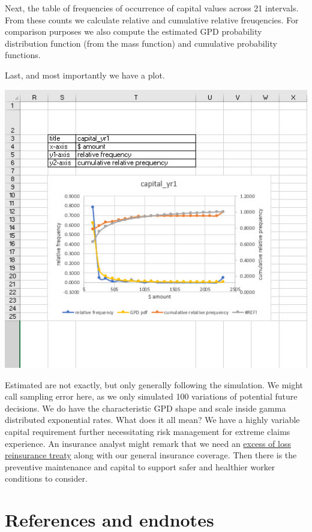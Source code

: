 \documentclass[
]{book}
\begin{document}
Next, the table of frequencies of occurrence of capital values across 21 intervals. From these counts we calculate relative and cumulative relative freuqencies. For comparison purposes we also compute the estimated GPD probability distribution function (from the mass function) and cumulative probability functions.

Last, and most importantly we have a plot.

\includegraphics{images/06/claims-eda-sim-plot.jpg}

Estimated are not exactly, but only generally following the simulation. We might call sampling error here, as we only simulated 100 variations of potential future decisions. We do have the characteristic GPD shape and scale inside gamma distributed exponential rates. What does it all mean? We have a highly variable capital requirement further necessitating risk management for extreme claims experience. An insurance analyst might remark that we need an \href{https://www.investopedia.com/terms/t/treaty-reinsurance.asp\#:~:text=Treaty\%20reinsurance\%20is\%20insurance\%20purchased\%20by\%20an\%20insurance,of\%20the\%20three\%20main\%20types\%20of\%20reinsurance\%20contracts.}{excess of loss reinsurance treaty} along with our general insurance coverage. Then there is the preventive maintenance and capital to support safer and healthier worker conditions to consider.

\hypertarget{references-and-endnotes}{%
\section{References and endnotes}\label{references-and-endnotes}}
\end{document}
